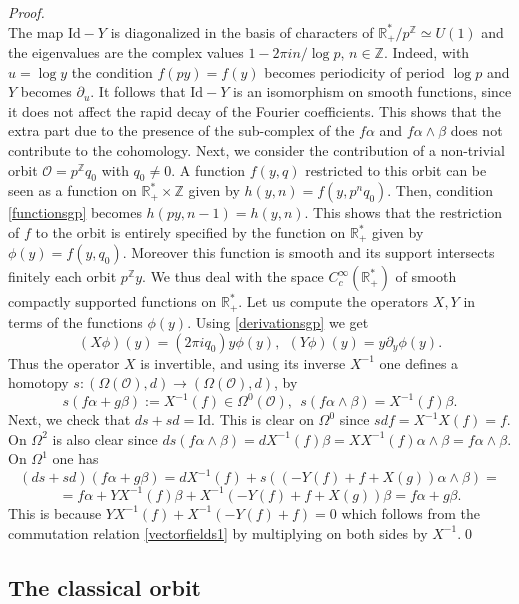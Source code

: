 \documentclass[graybox, envcountsect%
]{svmult}
\def\id{{\rm id}}
\def\R{{\mathbb R}}
\def\Z{{\mathbb Z}}
\def\cO{{\mathcal O}}
\def\id{{\mbox{Id}}}
\begin{document}
\begin{proof}
$$$$
The map $\id-Y$ is diagonalized in the basis of characters of $\R_+^*/p^\Z\simeq U(1)$ and the eigenvalues are the complex values $1-2\pi i n/\log p$, $n\in \Z$. Indeed, with $u=\log y$ the condition $f(py)=f(y)$ becomes periodicity of period $\log p$ and $Y$ becomes $\partial_u$. It follows that $\id-Y$ is an isomorphism on smooth functions, since it does not affect the rapid decay of the Fourier coefficients. This shows that the extra part due to the  presence of the sub-complex of the $f\alpha$ and $f\alpha\wedge \beta$ does not contribute to the cohomology.\newline 
Next, we consider the contribution of a non-trivial orbit $\cO=p^\Z q_0$ with $q_0\neq 0$. A function $f(y,q)$ restricted to this orbit can be seen as a function on $\R_+^*\times \Z$ given by $h(y,n)=f(y,p^n q_0)$. Then, condition \eqref{functionsgp} becomes $h(py,n-1)=h(y,n)$. This shows that the restriction of $f$ to the orbit is entirely specified by the function on $\R_+^*$ given by $\phi(y)=f(y,q_0)$. Moreover this function is smooth and its support intersects finitely each orbit $p^\Z y$. We thus deal with the space $C_c^\infty(\R_+^*)$ of smooth compactly supported functions on $\R_+^*$. Let us compute the operators $X,Y$ in terms of the functions $\phi(y)$. Using \eqref{derivationsgp} we get 
$$
(X\phi)(y)=(2\pi i q_0)y\phi(y), \ \ (Y\phi)(y)=y\partial_y\phi(y). 
$$
Thus the operator $X$ is invertible, and using its inverse $X^{-1}$ one defines a homotopy $s:(\Omega(\cO),d)\to (\Omega(\cO),d)$, by
$$
s(f\alpha+g\beta):=X^{-1}(f)\in \Omega^0(\cO), \ \ s(f\alpha\wedge \beta)=X^{-1}(f)\beta.
$$
Next, we check that $ds+sd=\id$. This is clear on $\Omega^0$ since $sdf=X^{-1}X(f)=f$. On $\Omega^2$ is also clear since $ds(f\alpha\wedge \beta)=dX^{-1}(f)\beta=XX^{-1}(f)\alpha\wedge \beta=f\alpha\wedge \beta$. On $\Omega^1$ one has 
$$
(ds+sd)(f\alpha+g\beta)=dX^{-1}(f)+s\left((-Y(f)+f+X(g)) \alpha\wedge \beta\right)=
$$
$$
=f\alpha+YX^{-1}(f)\beta +X^{-1}(-Y(f)+f+X(g))\beta=f\alpha+g\beta.
$$
This is because $YX^{-1}(f)+X^{-1}(-Y(f)+f)=0$ which follows from the commutation relation \eqref{vectorfields1} by multiplying on both sides by $X^{-1}$.\qed\end{proof}


\subsection{The classical orbit}\label{subsec:5.4}
\end{document}
